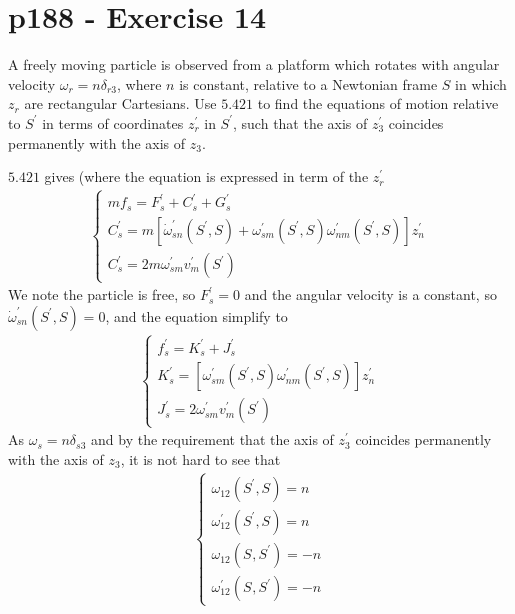 \section{p188 - Exercise 14}
\begin{tcolorbox}
A freely moving particle is observed from a platform which rotates with angular velocity $\omega_r = n\delta_{r3}$, where $n$ is constant, relative to a Newtonian frame $S$ in which $z_r$ are rectangular Cartesians. Use $\mathbf{5.421}$ to find the equations of motion relative to $S^{'}$ in terms of coordinates  $z^{'}_r$ in $S^{'}$, such that the axis of $z^{'}_3$ coincides permanently with the axis of $z_3$.
\end{tcolorbox} 
$\mathbf{5.421}$ gives (where the equation is expressed in term of the $z^{'}_r$
\begin{align}
\left\{\begin{array}{l}
mf_s = F^{'}_s + C^{'}_s + G^{'}_s\\
C^{'}_s= m\left[\dot{\omega}^{'}_{sn}\left(S^{'},S\right) + \omega^{'}_{sm}\left(S^{'},S\right)\omega^{'}_{nm}\left(S^{'},S\right)\right]z^{'}_n\\
C^{'}_s = 2m\omega^{'}_{sm}v^{'}_m\left(S^{'}\right)
\end{array}\right.
\end{align}
We note the particle is free, so $F^{'}_s=0$ and the angular velocity is a constant, so $\dot{\omega}^{'}_{sn}\left(S^{'},S\right)=0$, and the equation simplify to 
\begin{align}
\left\{\begin{array}{l}
f^{'}_s = K^{'}_s + J^{'}_s\\
K^{'}_s= \left[ \omega^{'}_{sm}\left(S^{'},S\right)\omega^{'}_{nm}\left(S^{'},S\right)\right]z^{'}_n\\
J^{'}_s = 2\omega^{'}_{sm}v^{'}_m\left(S^{'}\right)
\end{array}\right.
\end{align}
As $\omega_s= n\delta_{s3}$ and by the requirement  that the axis of $z^{'}_3$ coincides permanently with the axis of $z_3$, it is not hard to see that
\begin{align}
\left\{\begin{array}{llll}
\omega^{}_{12}\left(S^{'},S\right) = n\\
\omega^{'}_{12}\left(S^{'},S\right) = n\\
\omega^{}_{12}\left(S^{},S^{'}\right) = -n\\
\omega^{'}_{12}\left(S^{},S^{'}\right) = -n
\end{array}\right.
\end{align}

